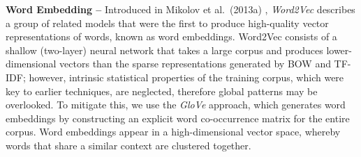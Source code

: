 \documentclass[12pt,a4paper]{article}
\begin{document}
\noindent \textbf{Word Embedding --} Introduced in Mikolov et al.\ (2013a) \cite{mikolov2013efficient}, \textit{Word2Vec} describes a group of related models that were the first to produce high-quality vector representations of words, known as word embeddings. Word2Vec consists of a shallow (two-layer) neural network that takes a large corpus and produces lower-dimensional vectors than the sparse representations generated by BOW and TF-IDF; however, intrinsic statistical properties of the training corpus, which were key to earlier techniques, are neglected, therefore global patterns may be overlooked. To mitigate this, we use the \textit{GloVe} \cite{pennington2014glove} approach, which generates word embeddings by constructing an explicit word co-occurrence matrix for the entire corpus. Word embeddings appear in a high-dimensional vector space, whereby words that share a similar context are clustered together.\\
\end{document}
